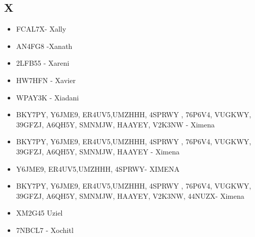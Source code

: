 \subsection*{X}
\begin{itemize}[leftmargin=*,nosep]
\item FCAL7X- Xally
\item AN4FG8 -Xanath
\item 2LFB55 - Xareni
\item HW7HFN - Xavier
\item WPAY3K - Xiadani
\item BKY7PY, Y6JME9, ER4UV5,UMZHHH, 4SPRWY , 76P6V4, VUGKWY, 39GFZJ, A6QH5Y, SMNMJW, HAAYEY, V2K3NW - Ximena
\item BKY7PY, Y6JME9, ER4UV5,UMZHHH, 4SPRWY , 76P6V4, VUGKWY, 39GFZJ, A6QH5Y, SMNMJW, HAAYEY - Ximena
\item Y6JME9, ER4UV5,UMZHHH, 4SPRWY- XIMENA
\item BKY7PY, Y6JME9, ER4UV5,UMZHHH, 4SPRWY , 76P6V4, VUGKWY, 39GFZJ, A6QH5Y, SMNMJW, HAAYEY, V2K3NW, 44NUZX- Ximena
\item XM2G45 Uziel
\item 7NBCL7 - Xochitl
\end{itemize}

